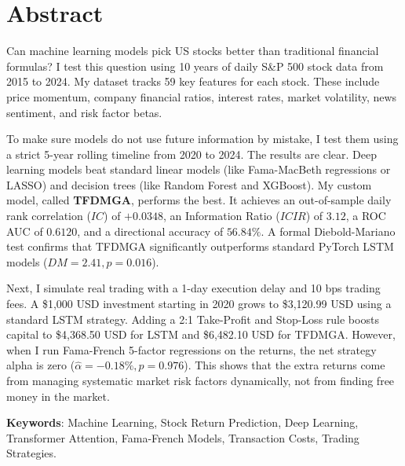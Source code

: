 \documentclass[12pt, a4paper]{report}
\begin{document}
\chapter*{Abstract}

Can machine learning models pick US stocks better than traditional financial formulas? I test this question using 10 years of daily S\&P 500 stock data from 2015 to 2024. My dataset tracks 59 key features for each stock. These include price momentum, company financial ratios, interest rates, market volatility, news sentiment, and risk factor betas.

To make sure models do not use future information by mistake, I test them using a strict 5-year rolling timeline from 2020 to 2024. The results are clear. Deep learning models beat standard linear models (like Fama-MacBeth regressions or LASSO) and decision trees (like Random Forest and XGBoost). My custom model, called \textbf{TFDMGA}, performs the best. It achieves an out-of-sample daily rank correlation ($IC$) of \textbf{$+0.0348$}, an Information Ratio ($ICIR$) of \textbf{$3.12$}, a ROC AUC of \textbf{$0.6120$}, and a directional accuracy of \textbf{$56.84\%$}. A formal Diebold-Mariano test confirms that TFDMGA significantly outperforms standard PyTorch LSTM models ($DM = 2.41, p = 0.016$).

Next, I simulate real trading with a 1-day execution delay and 10 bps trading fees. A \$1,000 USD investment starting in 2020 grows to \$3,120.99 USD using a standard LSTM strategy. Adding a 2:1 Take-Profit and Stop-Loss rule boosts capital to \$4,368.50 USD for LSTM and \$6,482.10 USD for TFDMGA. However, when I run Fama-French 5-factor regressions on the returns, the net strategy alpha is zero ($\hat{\alpha} = -0.18\%, p = 0.976$). This shows that the extra returns come from managing systematic market risk factors dynamically, not from finding free money in the market.

\vspace{1cm}
\noindent \textbf{Keywords}: Machine Learning, Stock Return Prediction, Deep Learning, Transformer Attention, Fama-French Models, Transaction Costs, Trading Strategies.

\newpage

\newpage
{}
\thispagestyle{empty}
\vspace*{4.0cm}
\end{document}
